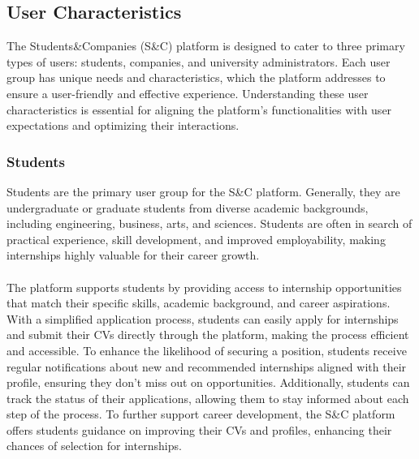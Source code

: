 \subsection{User Characteristics}

The Students\&Companies (S\&C) platform is designed to cater to three primary types of users: students, companies, and university administrators. Each user group has unique needs and characteristics, which the platform addresses to ensure a user-friendly and effective experience. Understanding these user characteristics is essential for aligning the platform’s functionalities with user expectations and optimizing their interactions.

\subsubsection{Students}
Students are the primary user group for the S\&C platform. Generally, they are undergraduate or graduate students from diverse academic backgrounds, including engineering, business, arts, and sciences. Students are often in search of practical experience, skill development, and improved employability, making internships highly valuable for their career growth. \\ \\
The platform supports students by providing access to internship opportunities that match their specific skills, academic background, and career aspirations. With a simplified application process, students can easily apply for internships and submit their CVs directly through the platform, making the process efficient and accessible. To enhance the likelihood of securing a position, students receive regular notifications about new and recommended internships aligned with their profile, ensuring they don’t miss out on opportunities. Additionally, students can track the status of their applications, allowing them to stay informed about each step of the process. To further support career development, the S\&C platform offers students guidance on improving their CVs and profiles, enhancing their chances of selection for internships.

